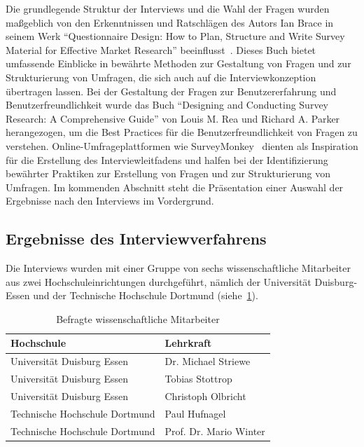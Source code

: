 Die grundlegende Struktur der Interviews und die Wahl der Fragen wurden maßgeblich von den Erkenntnissen und Ratschlägen
des Autors Ian Brace in seinem Werk ``Questionnaire Design: How to Plan, Structure and Write Survey Material for
Effective Market Research'' beeinflusst~\cite{brace2018questionnaire}. Dieses Buch bietet umfassende Einblicke in
bewährte Methoden zur Gestaltung von Fragen und zur Strukturierung von Umfragen, die sich auch auf die
Interviewkonzeption übertragen lassen. Bei der Gestaltung der Fragen zur Benutzererfahrung und Benutzerfreundlichkeit
wurde das Buch ``Designing and Conducting Survey Research: A Comprehensive Guide'' von Louis M. Rea und Richard
A. Parker~\cite{rea2014designing} herangezogen, um die Best Practices für die Benutzerfreundlichkeit von Fragen zu
verstehen. Online-Umfrageplattformen wie SurveyMonkey~\cite{monkey} dienten als Inspiration für die Erstellung des
Interviewleitfadens und halfen bei der Identifizierung bewährter Praktiken zur Erstellung von Fragen und zur
Strukturierung von Umfragen. Im kommenden Abschnitt steht die Präsentation einer Auswahl der Ergebnisse nach den
Interviews im Vordergrund.


\subsection{Ergebnisse des Interviewverfahrens}

Die Interviews wurden mit einer Gruppe von sechs wissenschaftliche Mitarbeiter aus zwei Hochschuleinrichtungen
durchgeführt, nämlich der Universität Duisburg-Essen und der Technische Hochschule Dortmund (siehe~\ref{tab:personnen}).

\begin{table}
    \centering
    \caption{Befragte wissenschaftliche Mitarbeiter} \label{tab:personnen}
    \begin{adjustbox}{scale=0.9}
        \begin{tabular}{ll}
            \toprule
            \textbf{Hochschule} & \textbf{Lehrkraft} \\
            \midrule
            Universität Duisburg Essen & Dr. Michael Striewe \\
            \midrule
            Universität Duisburg Essen & Tobias Stottrop \\
            \midrule
            Universität Duisburg Essen & Christoph Olbricht \\
            \midrule
            Technische Hochschule Dortmund & Paul Hufnagel \\
            \midrule
            Technische Hochschule Dortmund & Prof. Dr. Mario Winter \\
            \bottomrule
        \end{tabular}
    \end{adjustbox}
\end{table}

